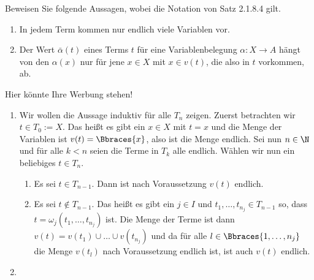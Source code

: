 \begin{exercise}
    Beweisen Sie folgende Aussagen, wobei die Notation von Satz 2.1.8.4 gilt. 
    \begin{enumerate}[label = \arabic*.]
        \item In jedem Term kommen  nur endlich viele Variablen vor.
        \item Der Wert $\bar{\alpha}(t)$ eines Terms $t$ für eine Variablenbelegung $\alpha: X \to A$ hängt von den $\alpha(x)$ nur für jene $x \in X$ mit $x \in v(t)$, die also in $t$ vorkommen, ab.
    \end{enumerate}
\end{exercise}

\begin{solution} 
    Hier könnte Ihre Werbung stehen!
    \begin{enumerate}[label = \arabic*.]
        \item Wir wollen die Aussage induktiv für alle $T_n$ zeigen. Zuerst betrachten wir $t \in T_0 := X$. Das heißt es gibt ein $x \in X$ mit $t = x$ und die Menge der Variablen ist $v(t) = \Bbraces{x}$, also ist die Menge endlich. Sei nun $n \in \N$ und für alle $k < n$ seien die Terme in $T_k$ alle endlich. Wählen wir nun ein beliebiges $t \in T_n$. 
        \begin{enumerate}[label = Fall \arabic*:]
            \item Es sei $t \in T_{n-1}$. Dann ist nach Voraussetzung $v(t)$ endlich.
            \item Es sei $t \notin T_{n-1}$. Das heißt es gibt ein $j \in I$ und $t_1, \dots, t_{n_j} \in T_{n-1}$ so, dass $t = \omega_j(t_1, \dots, t_{n_j})$ ist. Die Menge der Terme ist dann $v(t) = v(t_1) \cup \dots \cup v(t_{n_j})$ und da für alle $l \in \Bbraces{1, \dots, n_j}$ die Menge $v(t_l)$ nach Voraussetzung endlich ist, ist auch $v(t)$ endlich. 
        \end{enumerate}
        \item
    \end{enumerate}
\end{solution}